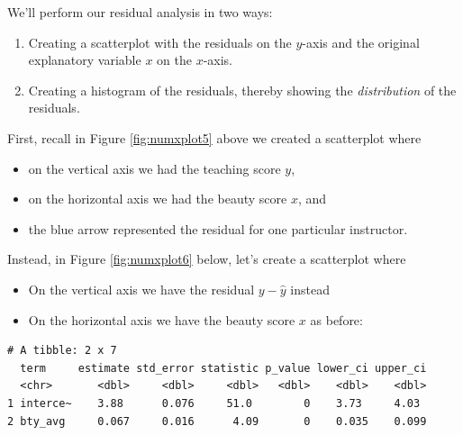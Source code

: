 \documentclass[12pt, krantz2,]{krantz}
\makeatletter
\newenvironment{Shaded}{\begin{snugshade}}{\end{snugshade}}
\newcommand{\CommentTok}[1]{\textcolor[rgb]{0.37,0.37,0.37}{\textit{#1}}}
\newcommand{\DataTypeTok}[1]{\textcolor[rgb]{0.27,0.27,0.27}{#1}}
\newcommand{\KeywordTok}[1]{\textcolor[rgb]{0.27,0.27,0.27}{\textbf{#1}}}
\newcommand{\NormalTok}[1]{#1}
\newcommand{\OperatorTok}[1]{\textcolor[rgb]{0.43,0.43,0.43}{\textbf{#1}}}
\newcommand{\StringTok}[1]{\textcolor[rgb]{0.5,0.5,0.5}{#1}}
\providecommand{\tightlist}{%
  \setlength{\itemsep}{0pt}\setlength{\parskip}{0pt}}
\newenvironment{kframe}{%
\medskip{}
\setlength{\fboxsep}{.8em}
 \def\at@end@of@kframe{}%
 \ifinner\ifhmode%
  \def\at@end@of@kframe{\end{minipage}}%
  \begin{minipage}{\columnwidth}%
 \fi\fi%
 \def\FrameCommand##1{\hskip\@totalleftmargin \hskip-\fboxsep
 \colorbox{shadecolor}{##1}\hskip-\fboxsep
     \hskip-\linewidth \hskip-\@totalleftmargin \hskip\columnwidth}%
 \MakeFramed {\advance\hsize-\width
   \@totalleftmargin\z@ \linewidth\hsize
   \@setminipage}}%
 {\par\unskip\endMakeFramed%
 \at@end@of@kframe}
\renewenvironment{Shaded}{\begin{kframe}}{\end{kframe}}
\makeatother
\begin{document}
We'll perform our residual analysis in two ways:

\begin{enumerate}
\def\labelenumi{\arabic{enumi}.}
\tightlist
\item
  Creating a scatterplot with the residuals on the \(y\)-axis and the original explanatory variable \(x\) on the \(x\)-axis.
\item
  Creating a histogram of the residuals, thereby showing the \emph{distribution} of the residuals.
\end{enumerate}

First, recall in Figure \ref{fig:numxplot5} above we created a scatterplot where

\begin{itemize}
\tightlist
\item
  on the vertical axis we had the teaching score \(y\),
\item
  on the horizontal axis we had the beauty score \(x\), and
\item
  the blue arrow represented the residual for one particular instructor.
\end{itemize}

Instead, in Figure \ref{fig:numxplot6} below, let's create a scatterplot where

\begin{itemize}
\tightlist
\item
  On the vertical axis we have the residual \(y-\widehat{y}\) instead
\item
  On the horizontal axis we have the beauty score \(x\) as before:
\end{itemize}

\begin{Shaded}
\end{Shaded}

\begin{verbatim}
# A tibble: 2 x 7
  term     estimate std_error statistic p_value lower_ci upper_ci
  <chr>       <dbl>     <dbl>     <dbl>   <dbl>    <dbl>    <dbl>
1 interce~    3.88      0.076     51.0        0    3.73     4.03 
2 bty_avg     0.067     0.016      4.09       0    0.035    0.099
\end{verbatim}
\end{document}
